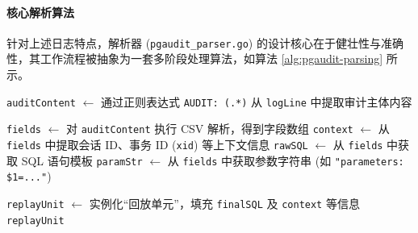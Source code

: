 \paragraph{核心解析算法}
针对上述日志特点，解析器 (\texttt{pgaudit\_parser.go}) 的设计核心在于健壮性与准确性，其工作流程被抽象为一套多阶段处理算法，如算法 \ref{alg:pgaudit-parsing} 所示。


\begin{algorithm}[htbp]
    \caption{\texttt{pgaudit} 日志解析与回放单元生成算法}
    \label{alg:pgaudit-parsing}
    


    \texttt{auditContent} $\leftarrow$ 通过正则表达式 \texttt{AUDIT: (.*)} 从 \texttt{logLine} 中提取审计主体内容\;
    
    
    \texttt{fields} $\leftarrow$ 对 \texttt{auditContent} 执行 CSV 解析，得到字段数组\;
    \texttt{context} $\leftarrow$ 从 \texttt{fields} 中提取会话 ID、事务 ID (\texttt{xid}) 等上下文信息\;
    \texttt{rawSQL} $\leftarrow$ 从 \texttt{fields} 中获取 SQL 语句模板\;
    \texttt{paramStr} $\leftarrow$ 从 \texttt{fields} 中获取参数字符串 (如 \texttt{"parameters: \$1=..."})\;
    
    
    \texttt{replayUnit} $\leftarrow$ 实例化“回放单元”，填充 \texttt{finalSQL} 及 \texttt{context} 等信息\;
    \Return \texttt{replayUnit}\;
    
\end{algorithm}

